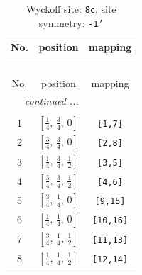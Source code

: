 \documentclass[fleqn,8pt]{jsarticle}
\begin{document}
\renewcommand{\arraystretch}{1.2}
\begin{longtable}{ccc}
\caption{Wyckoff site: {\tt 8c}, site symmetry: {\tt -1'}}
 \\
 \hline \hline
No. & position & mapping \\ \hline \endfirsthead

\multicolumn{2}{l}{\tablename\ \thetable{}} \\
 \hline \hline
No. & position & mapping \\ \hline \endhead

 \hline \hline
\multicolumn{2}{r}{\footnotesize\it continued ...} \\ \endfoot

 \hline \hline
\multicolumn{2}{r}{} \\ \endlastfoot

1 & $\left[ \frac{1}{4},\, \frac{3}{4},\, 0 \right]$ & {\tt [1,7]} \\ \hline
2 & $\left[ \frac{3}{4},\, \frac{3}{4},\, 0 \right]$ & {\tt [2,8]} \\ \hline
3 & $\left[ \frac{1}{4},\, \frac{3}{4},\, \frac{1}{2} \right]$ & {\tt [3,5]} \\ \hline
4 & $\left[ \frac{3}{4},\, \frac{3}{4},\, \frac{1}{2} \right]$ & {\tt [4,6]} \\ \hline
5 & $\left[ \frac{3}{4},\, \frac{1}{4},\, 0 \right]$ & {\tt [9,15]} \\ \hline
6 & $\left[ \frac{1}{4},\, \frac{1}{4},\, 0 \right]$ & {\tt [10,16]} \\ \hline
7 & $\left[ \frac{3}{4},\, \frac{1}{4},\, \frac{1}{2} \right]$ & {\tt [11,13]} \\ \hline
8 & $\left[ \frac{1}{4},\, \frac{1}{4},\, \frac{1}{2} \right]$ & {\tt [12,14]} \\
\end{longtable}
\renewcommand{\arraystretch}{1.2}
\end{document}
